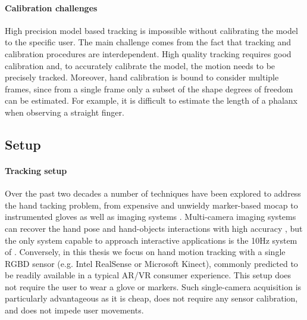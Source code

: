 \paragraph{Calibration challenges} High precision model based tracking is impossible without calibrating the model to the specific user. The main challenge comes from the fact that tracking and calibration procedures are interdependent. High quality tracking requires good calibration and, to accurately calibrate the model, the motion needs to be precisely tracked. Moreover, hand calibration is bound to consider multiple frames, since from a single frame only a subset of the shape degrees of freedom can be estimated. For example, it is difficult to estimate the length of a phalanx when observing a straight finger.

\subsection*{Setup}

\paragraph{Tracking setup} Over the past two decades a number of techniques have been explored to address the hand tacking problem, from expensive and unwieldy marker-based mocap \cite{mocapsurvey} to instrumented gloves \cite{dipietro2008survey} as well as imaging systems \cite{erol2007vision}. Multi-camera imaging systems can recover the hand pose and hand-objects interactions with high accuracy \cite{ballan2013salient}, but the only system capable to approach interactive applications is the 10Hz system of \cite{sridhar2013multicam}. Conversely, in this thesis we focus on hand motion tracking with a single RGBD sensor (e.g. Intel RealSense or Microsoft Kinect), commonly predicted to be readily available in a typical AR/VR consumer experience.
This setup does not require the user to wear a glove or markers. Such single-camera acquisition is particularly advantageous as it is cheap, does not require any sensor calibration, and does not impede user movements.

